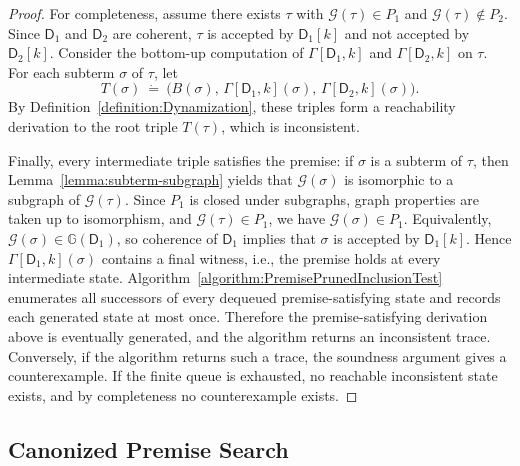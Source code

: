 \documentclass[11pt,a4paper]{article}
\newcommand{\treewidthvalue}{k}
\newcommand{\decompositiongraph}[1]{\mathcal{G}(#1)}
\newcommand{\topbagname}{B}
\newcommand{\topbag}[1]{\topbagname(#1)}
\newcommand{\abstractdecomposition}{\tau}
\newcommand{\sigmaabstractdecomposition}{\sigma}
\newcommand{\defeq}{~\dot{=}~}
\newcommand{\dpcoregraphproperty}[1]{\mathbb{G}(#1)}
\newcommand{\dpcore}{\mathsf{D}}
\newcommand{\dynamizationfunctionname}[1]{\Gamma[{#1}]}
\newcommand{\dynamizationfunction}[2]{\dynamizationfunctionname{#1,#2}}
\begin{document}
\begin{proof}
	For completeness, assume there exists $\abstractdecomposition$ with $\decompositiongraph{\abstractdecomposition}\in P_1$ and $\decompositiongraph{\abstractdecomposition}\notin P_2$. Since $\dpcore_1$ and $\dpcore_2$ are coherent, $\abstractdecomposition$ is accepted by $\dpcore_1[\treewidthvalue]$ and not accepted by $\dpcore_2[\treewidthvalue]$. Consider the bottom-up computation of $\dynamizationfunction{\dpcore_1}{\treewidthvalue}$ and $\dynamizationfunction{\dpcore_2}{\treewidthvalue}$ on $\abstractdecomposition$. For each subterm $\sigmaabstractdecomposition$ of $\abstractdecomposition$, let
	\[
	T(\sigmaabstractdecomposition)\defeq \bigl(\topbag{\sigmaabstractdecomposition},\,\dynamizationfunction{\dpcore_1}{\treewidthvalue}(\sigmaabstractdecomposition),\,\dynamizationfunction{\dpcore_2}{\treewidthvalue}(\sigmaabstractdecomposition)\bigr).
	\]
	By Definition~\ref{definition:Dynamization}, these triples form a reachability derivation to the root triple $T(\abstractdecomposition)$, which is inconsistent.

			Finally, every intermediate triple satisfies the premise: if $\sigmaabstractdecomposition$ is a subterm of $\abstractdecomposition$, then Lemma~\ref{lemma:subterm-subgraph} yields that $\decompositiongraph{\sigmaabstractdecomposition}$ is isomorphic to a subgraph of $\decompositiongraph{\abstractdecomposition}$. Since $P_1$ is closed under subgraphs, graph properties are taken up to isomorphism, and $\decompositiongraph{\abstractdecomposition}\in P_1$, we have $\decompositiongraph{\sigmaabstractdecomposition}\in P_1$. Equivalently, $\decompositiongraph{\sigmaabstractdecomposition}\in \dpcoregraphproperty{\dpcore_1}$, so coherence of $\dpcore_1$ implies that $\sigmaabstractdecomposition$ is accepted by $\dpcore_1[\treewidthvalue]$. Hence $\dynamizationfunction{\dpcore_1}{\treewidthvalue}(\sigmaabstractdecomposition)$ contains a final witness, i.e., the premise holds at every intermediate state.
			Algorithm~\ref{algorithm:PremisePrunedInclusionTest} enumerates all successors of every dequeued premise-satisfying state and records each generated state at most once. Therefore the premise-satisfying derivation above is eventually generated, and the algorithm returns an inconsistent trace. Conversely, if the algorithm returns such a trace, the soundness argument gives a counterexample. If the finite queue is exhausted, no reachable inconsistent state exists, and by completeness no counterexample exists.
\end{proof}

\subsection{Canonized Premise Search}
\label{subsection:canonized-premise-search}
\end{document}
